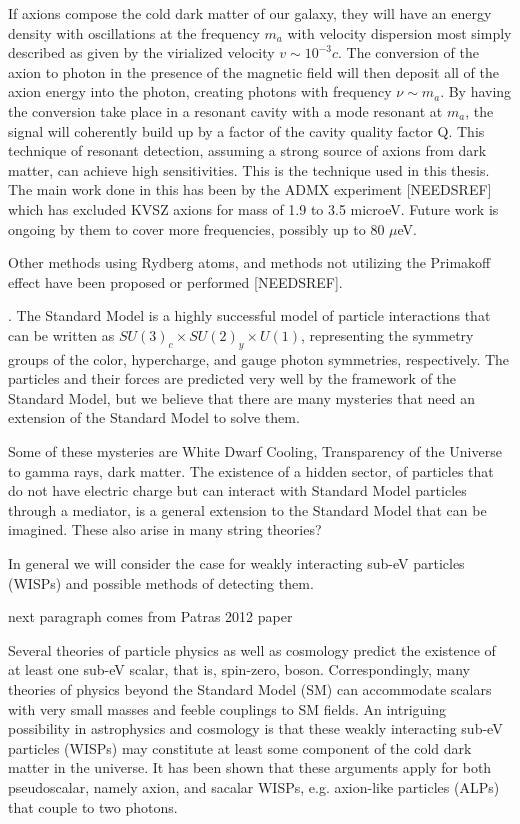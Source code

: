 \documentclass[11pt]{book}
\begin{document}
If axions compose the cold dark matter of our galaxy, they will have an energy density with oscillations at the frequency $m_a$ with velocity dispersion most simply described as given by the virialized velocity $v \sim 10^{-3}c$. The conversion of the axion to photon in the presence of the magnetic field will then deposit all of the axion energy into the photon, creating photons with frequency $\nu \sim m_a$. By having the conversion take place in a resonant cavity with a mode resonant at $m_a$, the signal will coherently build up by a factor of the cavity quality factor Q. This technique of resonant detection, assuming a strong source of axions from dark matter, can achieve high sensitivities. This is the technique used in this thesis. The main work done in this has been by the ADMX experiment [NEEDSREF] which has excluded KVSZ axions for mass of 1.9 to 3.5 microeV. Future work is ongoing by them to cover more frequencies, possibly up to 80 $\mu$eV.

Other methods using Rydberg atoms, and methods not utilizing the Primakoff effect have been proposed or performed [NEEDSREF].











.
The Standard Model is a highly successful model of particle interactions that can be written as $SU(3)_c \times SU(2)_y \times U(1)$, representing the symmetry groups of the color, hypercharge, and gauge photon symmetries, respectively. The particles and their forces are predicted very well by the framework of the Standard Model, but we believe that there are many mysteries that need an extension of the Standard Model to solve them.

Some of these mysteries are White Dwarf Cooling, Transparency of the Universe to gamma rays, dark matter. The existence of a hidden sector, of particles that do not have electric charge but can interact with Standard Model particles through a mediator, is a general extension to the Standard Model that can be imagined. These also arise in many string theories?

In general we will consider the case for weakly interacting sub-eV particles (WISPs) and possible methods of detecting them.

{\color{blue} next paragraph comes from Patras 2012 paper}

Several theories of particle physics as well as cosmology predict the existence of at least one sub-eV scalar, that is, spin-zero, boson. Correspondingly, many theories of physics beyond the Standard Model (SM) can accommodate scalars with very small masses and feeble couplings to SM fields. An  intriguing possibility in astrophysics and cosmology is that these weakly interacting sub-eV particles (WISPs) may constitute at least some component of the cold dark matter in the universe. It has been shown that these arguments apply for both pseudoscalar, namely axion, and sacalar WISPs, e.g. axion-like particles (ALPs) that couple to two photons.
\end{document}
